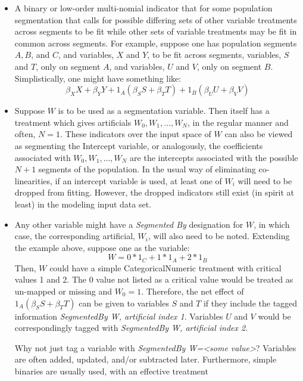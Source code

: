 \documentclass[10pt]{article}
\begin{document}
\begin{itemize}
    \item A binary or low-order multi-nomial indicator that for some population segmentation that calls for 
        possible differing sets of other variable treatments across segments to be fit while other 
        sets of variable treatments may be fit in common across segments.  For example, suppose one has 
        population segments $A, B$, and $C$, and variables, $X$ and $Y$, to be fit across segments, 
        variables, $S$ and $T$, only on segment $A$, and variables, $U$ and $V$, only on segment $B$.
        Simplistically, one might have something like:
        $$\beta_XX+\beta_YY + 1_A (\beta_SS+\beta_TT) + 1_B(\beta_UU+\beta_VV)$$
    \item Suppose $W$ is to be used as a segmentation variable.  Then itself has a treatment which gives artificials
        $W_0, W_1, \ldots, W_N$, in the regular manner and often, $N=1$.  These indicators over the input 
        space of $W$ can also be viewed as segmenting the Intercept variable, or analogously, the 
        coefficients associated with $W_0, W_1, \ldots, W_N$ are the intercepts associated with 
        the possible $N+1$ segments of the population.  
        In the usual way of eliminating co-linearities, if an intercept variable is used,
        at least one of $W_i$ will need to be dropped from fitting. However, the dropped indicators still exist
        (in spirit at least) in the modeling input data set.
    \item Any other variable might have a {\em Segmented By} designation for $W$, in which case, the corresponding 
        artificial, $W_i$, will also need to be noted.  Extending the example above, suppose one as the variable:
        $$W= 0*1_C + 1*1_A + 2*1_B$$
        Then, $W$ could have a simple CategoricalNumeric treatment with critical values 1 and 2.  The 0 value not 
        listed as a critical value would be treated as un-mapped or missing and $W_0=1$.
        Therefore, the net effect of $1_A(\beta_SS+\beta_TT)$ can be given to variables $S$ and $T$ 
        if they include the tagged information {\em SegmentedBy W, artificial index 1}.  Variables $U$ and $V$
        would be correspondingly tagged with {\em SegmentedBy W, artificial index 2}.\par
        Why not just tag a variable with {\em SegmentedBy W=<some value>}? Variables are often added, updated,
        and/or subtracted later. Furthermore, simple binaries are usually used, with an effective treatment

\end{itemize}
\end{document}
